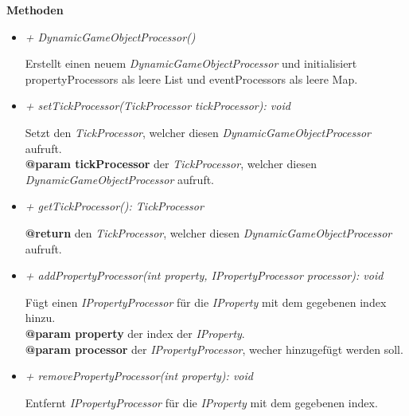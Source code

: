             \pagebreak
            \textbf{Methoden}
            \begin{itemize}
                \item \textit{+ DynamicGameObjectProcessor()}
                    \begin{leftbar}[0.9\linewidth]
                        Erstellt einen neuem \textit{DynamicGameObjectProcessor} und initialisiert propertyProcessors als leere List
                        und eventProcessors als leere Map.
                    \end{leftbar}
                \item \textit{+ setTickProcessor(TickProcessor tickProcessor): void}
                    \begin{leftbar}[0.9\linewidth]
                        Setzt den \textit{TickProcessor}, welcher diesen \textit{DynamicGameObjectProcessor} aufruft.\\
                        \textbf{@param tickProcessor} der \textit{TickProcessor}, welcher diesen \textit{DynamicGameObjectProcessor} aufruft.
                    \end{leftbar}
                \item \textit{+ getTickProcessor(): TickProcessor}
                    \begin{leftbar}[0.9\linewidth]
                        \textbf{@return} den \textit{TickProcessor}, welcher diesen \textit{DynamicGameObjectProcessor} aufruft.
                    \end{leftbar}
                \item \textit{+ addPropertyProcessor(int property, IPropertyProcessor processor): void}
                    \begin{leftbar}[0.9\linewidth]
                        Fügt einen \textit{IPropertyProcessor} für die \textit{IProperty} mit dem gegebenen index hinzu.\\
                        \textbf{@param property} der index der \textit{IProperty}.\\
                        \textbf{@param processor} der \textit{IPropertyProcessor}, wecher hinzugefügt werden soll.
                    \end{leftbar}
                \item \textit{+ removePropertyProcessor(int property): void}
                    \begin{leftbar}[0.9\linewidth]
                        Entfernt \textit{IPropertyProcessor} für die \textit{IProperty} mit dem gegebenen index.\\

\end{leftbar}
\end{itemize}
